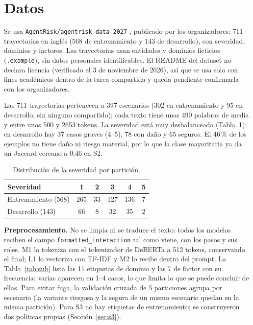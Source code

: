 \documentclass[conference]{IEEEtran}
\begin{document}
\section{Datos}
Se usa \texttt{AgentRisk/agentrisk-data-2027} \cite{data2026}, publicado por los organizadores: 711 trayectorias en inglés (568 de entrenamiento y 143 de desarrollo), con severidad, dominios y factores. Las trayectorias usan entidades y dominios ficticios (\texttt{.example}), sin datos personales identificables. El README del dataset no declara licencia (verificado el 3 de noviembre de 2026), así que se usa solo con fines académicos dentro de la tarea compartida y queda pendiente confirmarla con los organizadores.

Las 711 trayectorias pertenecen a 397 escenarios (302 en entrenamiento y 95 en desarrollo, sin ninguno compartido); cada texto tiene unas 490 palabras de media y entre unos 500 y 2653 tokens. La severidad está muy desbalanceada (Tabla~\ref{tab:sev}): en desarrollo hay 37 casos graves (4--5), 78 con daño y 65 seguros. El 46\,\% de los ejemplos no tiene daño ni riesgo material, por lo que la clase mayoritaria ya da un Jaccard cercano a 0,46 en S2.

\begin{table}[t]
\centering
\caption{Distribución de la severidad por partición.}
\label{tab:sev}
\footnotesize
\begin{tabular}{@{}lccccc@{}}
\toprule
Severidad & 1 & 2 & 3 & 4 & 5 \\
\midrule
Entrenamiento (568) & 265 & 33 & 127 & 136 & 7 \\
Desarrollo (143) & 66 & 8 & 32 & 35 & 2 \\
\bottomrule
\end{tabular}
\end{table}

\textbf{Preprocesamiento.} No se limpia ni se traduce el texto: todos los modelos reciben el campo \texttt{formatted\_interaction} tal como viene, con los pasos y sus roles. M1 lo tokeniza con el tokenizador de DeBERTa a 512 tokens, conservando el final; L1 lo vectoriza con TF-IDF y M2 lo recibe dentro del prompt. La Tabla~\ref{tab:sub} lista las 11 etiquetas de dominio y las 7 de factor con su frecuencia: varias aparecen en 1--4 casos, lo que limita lo que se puede concluir de ellas. Para evitar fuga, la validación cruzada de 5 particiones agrupa por escenario (la variante riesgosa y la segura de un mismo escenario quedan en la misma partición). Para S3 no hay etiquetas de entrenamiento; se construyeron dos políticas propias (Sección~\ref{sec:s3}).
\end{document}
